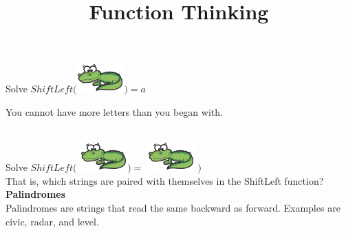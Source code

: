 \documentclass{ximera}
\title{Function Thinking}
\begin{document}
\begin{abstract}
\end{abstract}

\maketitle






\begin{question}
Solve $ShiftLeft($\includegraphics{pics/alligator.png}$) = a$
\begin{multipleChoice}
\end{multipleChoice}
\begin{feedback}
You cannot have more letters than you began with.
\end{feedback}
\end{question}




\begin{exploration}
\quad \\
Solve $ShiftLeft( $ \includegraphics{pics/alligator.png}$ ) = $ \includegraphics{pics/alligator.png} $)$ \\
That is, which strings are paired with themselves in the ShiftLeft function?
\quad \\

\textbf{Palindromes} \\
Palindromes are strings that read the same backward as forward.  Examples are civic, radar, and level.
\end{exploration}
\end{document}
